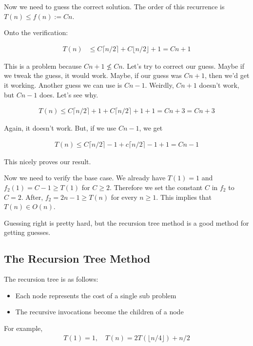 \documentclass[11pt,a4paper,titlepage,dvipsnames,cmyk]{scrartcl}
\begin{document}
Now we need to guess the correct solution. The order of this recurrence is
$T(n) \le f(n) := Cn$.

Onto the verification:

\begin{align*}
    T(n) &\le C\lceil n/2 \rceil + C \lfloor n/2 \rfloor + 1 = Cn + 1
\end{align*}

This is a problem because $Cn+1 \not \le Cn$. Let's try to correct our
guess. Maybe if we tweak the guess, it would work. Maybe, if our guess was
$Cn + 1$, then we'd get it working. Another guess we can use is $Cn - 1$.
Weirdly, $Cn + 1$ doesn't work, but $Cn - 1$ does. Let's see why.

\begin{align*}
    T(n) \le C \lceil n/2 \rceil + 1 + C \lceil n/2 \rceil + 1 + 1 = Cn +
    3 = Cn + 3
\end{align*}

Again, it doesn't work. But, if we use $Cn - 1$, we get

\begin{align*}
    T(n) \le C \lceil n/2 \rceil -1 + c\lceil n/2 \rceil -1 + 1 = Cn -1
\end{align*}

This nicely proves our result.

Now we need to verify the base case. We already have $T(1) = 1$ and
$f_2(1) = C - 1 \ge T(1)$ for $C \ge 2$. Therefore we set the constant $C$
in $f_2$ to $C = 2$. After, $f_2 = 2n - 1 \ge T(n)$ for every $n \ge 1$.
This implies that $T(n) \in O(n)$.

Guessing right is pretty hard, but the recursion tree method is a good
method for getting guesses.

\subsection{The Recursion Tree Method}%
\label{sub:The Recursion Tree Method}
The recursion tree is as follows:

\begin{itemize}
    \item Each node represents the cost of a single sub problem
    \item The recursive invocations become the children of a node
\end{itemize}

For example,
\begin{align*}
    T(1) = 1, \quad T(n) = 2T(\lfloor n/4 \rfloor) + n/2
\end{align*}
\end{document}
